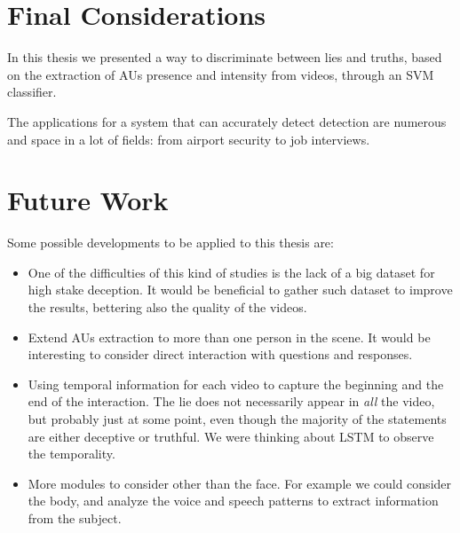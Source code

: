 

\section{Final Considerations}
In this thesis we presented a way to discriminate between lies and truths, based on the extraction of AUs presence and intensity from videos, through an SVM classifier.

The applications for a system that can accurately detect detection are numerous and space in a lot of fields: from airport security to job interviews.





\section{Future Work} \label{fw}
Some possible developments to be applied to this thesis are:
\begin{itemize}
	\item One of the difficulties of this kind of studies is the lack of a big dataset for high stake deception. It would be beneficial to gather such dataset to improve the results, bettering also the quality of the videos.
	\item Extend AUs extraction to more than one person in the scene. It would be interesting to consider direct interaction with questions and responses. 
	\item Using temporal information for each video to capture the beginning and the end of the interaction. The lie does not necessarily appear in \textit{all} the video, but probably just at some point, even though the majority of the statements are either deceptive or truthful. We were thinking about LSTM to observe the temporality.
	\item More modules to consider other than the face. For example we could consider the body, and analyze the voice and speech patterns to extract information from the subject.
\end{itemize}